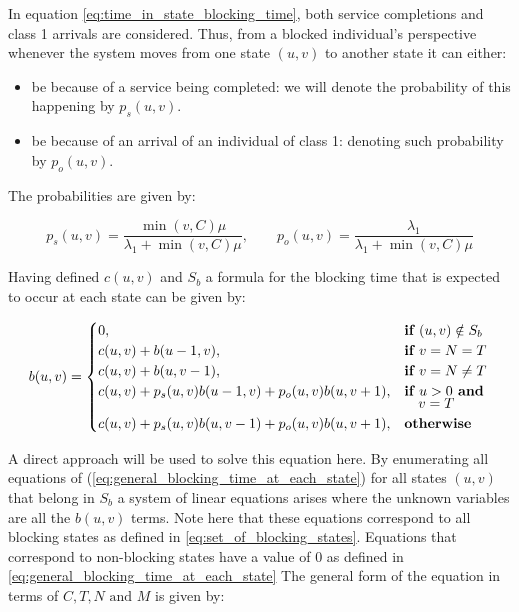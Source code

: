 In equation \ref{eq:time_in_state_blocking_time}, both service completions and 
class 1 arrivals are considered. 
Thus, from a blocked individual's perspective whenever the system moves from one 
state \((u,v)\)
to another state it can either:

\begin{itemize}
    \item be because of a service being completed: we will denote the probability 
    of this happening by \(p_s(u,v)\). 
    \item be because of an arrival of an individual of class 1: denoting such 
    probability by \(p_o(u,v)\).
\end{itemize}
The probabilities are given by:

\begin{equation*}
    p_s(u,v) = \frac{\min(v,C)\mu}{\lambda_1 + \min(v,C)\mu}, \qquad
    p_o(u,v) = \frac{\lambda_1}{\lambda_1 + \min(v,C)\mu}
\end{equation*}


Having defined \(c(u,v)\) and \(S_b\) a formula for the blocking time that is
expected to occur at each state can be given by:

\begin{equation}\label{eq:general_blocking_time_at_each_state}
    b(u,v) = 
    \begin{cases} 
        0, & \textbf{if } (u,v) \notin S_b \\
        c(u,v) + b(u - 1, v), & \textbf{if } v = N = T\\
        c(u,v) + b(u, v-1), & \textbf{if } v = N \neq T \\
        c(u,v) + p_s(u,v) b(u-1, v) + p_o(u,v) b(u, v+1), & \textbf{if } u > 0 
        \textbf{ and } \vspace{-0.2cm} \\ 
        & \quad v = T \\
        c(u,v) + p_s(u,v) b(u, v-1) + p_o(u,v) b(u, v+1), & \textbf{otherwise} \\
    \end{cases}
\end{equation}

A direct approach will be used to solve this equation here. 
By enumerating all equations of (\ref{eq:general_blocking_time_at_each_state}) 
for all states \((u,v)\) that belong in \(S_b\) 
a system of linear equations arises where the unknown variables are all the 
\(b(u,v)\) terms. 
Note here that these equations correspond to all blocking states as defined in
\ref{eq:set_of_blocking_states}. 
Equations that correspond to non-blocking states have a value of \(0\) as 
defined in \ref{eq:general_blocking_time_at_each_state}
The general form of the equation in terms of \(C,T,N \text{ and } M\) is given by: 

